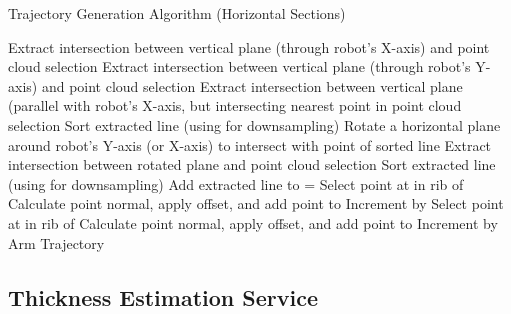 \begin{spacing}{0.8}
\begin{algorithm}[H]
\caption{Trajectory Generation Algorithm (Horizontal Sections)}
\label{alg:trajh}
\begin{algorithmic}[1]
\begin{raggedright}
\State Extract intersection between vertical plane (through robot's X-axis) and point cloud selection
\State Extract intersection between vertical plane (through robot's Y-axis) and point cloud selection
\EndIf
{}
\State Extract intersection between vertical plane (parallel with robot's X-axis, but intersecting nearest point in point cloud selection
\EndIf 
\State Sort extracted line (using  for downsampling)
\State Rotate a horizontal plane around robot's Y-axis (or X-axis) to intersect with point  of sorted line
\State Extract intersection between rotated plane and point cloud selection
\State Sort extracted line (using  for downsampling)
\State Add extracted line to 
\EndFor
\State {} = 
\State Select point at  in rib  of 
\State Calculate point normal, apply offset, and add point to 
\EndFor
\State Increment  by 
\State Select point at  in rib  of 
\State Calculate point normal, apply offset, and add point to 
\EndFor
\State Increment  by 
\EndWhile
\EndFunction\\
\Return Arm Trajectory
\end{raggedright}
\end{algorithmic}
\end{algorithm}
\end{spacing}
\subsection{Thickness Estimation Service}


